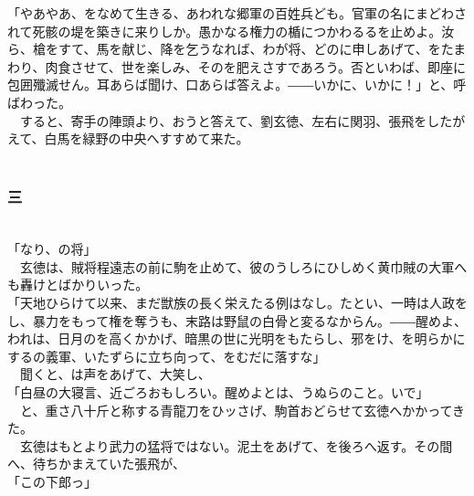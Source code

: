 \documentclass[
  paper=a5,
  fontsize=10pt,
  jafontsize=9.5pt,
  tate,                  %
  open_bracket_pos=nibu, %
]{jlreq}
\begin{document}
「やあやあ、をなめて生きる、あわれな郷軍の百姓兵ども。官軍の名にまどわされて死骸の堤を築きに来りしか。愚かなる権力の楯につかわるるを止めよ。汝ら、槍をすて、馬を献じ、降を乞うなれば、わが将、どのに申しあげて、をたまわり、肉食させて、世を楽しみ、そのを肥えさすであろう。否といわば、即座に包囲殲滅せん。耳あらば聞け、口あらば答えよ。――いかに、いかに！」と、呼ばわった。\\


　すると、寄手の陣頭より、おうと答えて、劉玄徳、左右に関羽、張飛をしたがえて、白馬を緑野の中央へすすめて来た。\\

\\

\subsubsection{三}

\\


「なり、の将」\\


　玄徳は、賊将程遠志の前に駒を止めて、彼のうしろにひしめく黄巾賊の大軍へも轟けとばかりいった。\\


「天地ひらけて以来、まだ獣族の長く栄えたる例はなし。たとい、一時は人政をし、暴力をもって権を奪うも、末路は野鼠の白骨と変るなからん。――醒めよ、われは、日月のを高くかかげ、暗黒の世に光明をもたらし、邪をけ、を明らかにするの義軍、いたずらに立ち向って、をむだに落すな」\\


　聞くと、は声をあげて、大笑し、\\


「白昼の大寝言、近ごろおもしろい。醒めよとは、うぬらのこと。いで」\\


　と、重さ八十斤と称する青龍刀をひッさげ、駒首おどらせて玄徳へかかってきた。\\


　玄徳はもとより武力の猛将ではない。泥土をあげて、を後ろへ返す。その間へ、待ちかまえていた張飛が、\\


「この下郎っ」\\
\end{document}
